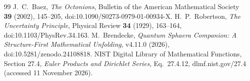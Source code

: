 \begin{thebibliography}{99}
J.~C.~Baez, \emph{The Octonions}, Bulletin of the American Mathematical
Society \textbf{39} (2002), 145--205,
doi:10.1090/S0273-0979-01-00934-X.
H.~P.~Robertson, \emph{The Uncertainty Principle}, Physical Review
\textbf{34} (1929), 163--164, doi:10.1103/PhysRev.34.163.
M.~Brendecke, \emph{Quantum Sphaera Companion: A Structure-First Mathematical
Unfolding}, v4.11.0 (2026), doi:10.5281/zenodo.24108818.
NIST Digital Library of Mathematical Functions, Section 27.4,
\emph{Euler Products and Dirichlet Series}, Eq.~27.4.12,
dlmf.nist.gov/27.4 (accessed 11 November 2026).
\end{thebibliography}
\clearpage
\appendix

